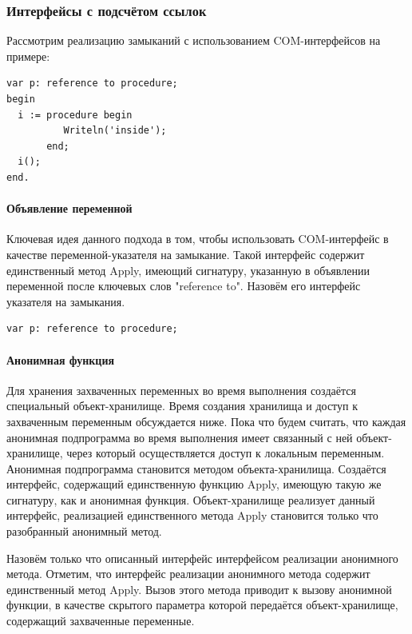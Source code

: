 \documentclass{imcs}
\begin{document}
\subsubsection{Интерфейсы с подсчётом ссылок}

Рассмотрим реализацию замыканий с использованием COM-интерфейсов на примере:

\begin{lstlisting}
var p: reference to procedure;
begin
  i := procedure begin
          Writeln('inside');
       end;
  i();
end.
\end{lstlisting}

\paragraph{Объявление переменной}

Ключевая идея данного подхода в том, чтобы использовать COM-интерфейс в качестве переменной-указателя
на замыкание. Такой интерфейс содержит единственный метод Apply, имеющий сигнатуру, указанную
в объявлении переменной после ключевых слов "reference to". Назовём его интерфейс указателя на
замыкания.

\begin{lstlisting}
var p: reference to procedure;
\end{lstlisting}

\paragraph{Анонимная функция}

Для хранения захваченных переменных во время выполнения
создаётся специальный объект-хранилище. Время создания хранилища
и доступ к захваченным переменным обсуждается ниже. Пока что будем считать, что каждая анонимная
подпрограмма во время выполнения имеет связанный с ней объект-хранилище, через
который осуществляется доступ к локальным переменным.
Анонимная подпрограмма становится методом объекта-хранилища. Создаётся интерфейс, содержащий
единственную функцию Apply, имеющую такую же сигнатуру, как и анонимная функция. Объект-хранилище
реализует данный интерфейс, реализацией единственного метода Apply становится только что
разобранный анонимный метод.

Назовём только что описанный интерфейс интерфейсом реализации анонимного метода. Отметим, что
интерфейс реализации анонимного метода содержит единственный метод Apply. Вызов этого метода
приводит к вызову анонимной функции, в качестве скрытого параметра которой
передаётся объект-хранилище, содержащий захваченные переменные.
\end{document}

